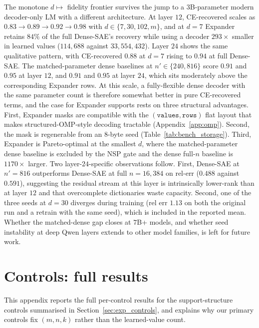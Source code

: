 \documentclass{article}
\theoremstyle{plain}
\theoremstyle{definition}
\theoremstyle{remark}
\begin{document}
The monotone $d \mapsto$ fidelity frontier survives the jump to a 3B-parameter modern decoder-only LM with a different architecture. At layer $12$, CE-recovered scales as $0.83 \to 0.89 \to 0.92 \to 0.98$ with $d \in \{7, 30, 102, m\}$, and at $d{=}7$ Expander retains $84\%$ of the full Dense-SAE's recovery while using a decoder $293\times$ smaller in learned values ($114{,}688$ against $33{,}554{,}432$). Layer $24$ shows the same qualitative pattern, with CE-recovered $0.88$ at $d{=}7$ rising to $0.94$ at full Dense-SAE. The matched-parameter dense baselines at $n' \in \{240, 816\}$ score $0.91$ and $0.95$ at layer $12$, and $0.91$ and $0.95$ at layer $24$, which sits moderately above the corresponding Expander rows. At this scale, a fully-flexible dense decoder with the same parameter count is therefore somewhat better in pure CE-recovered terms, and the case for Expander supports rests on three structural advantages. First, Expander masks are compatible with the $(\texttt{values}, \texttt{rows})$ flat layout that makes structured-OMP-style decoding tractable (Appendix~\ref{app:omp}). Second, the mask is regenerable from an $8$-byte seed (Table~\ref{tab:bench_storage}). Third, Expander is Pareto-optimal at the smallest $d$, where the matched-parameter dense baseline is excluded by the NSP gate and the dense full-$n$ baseline is $1170\times$ larger. Two layer-$24$-specific observations follow. First, Dense-SAE at $n'{=}816$ outperforms Dense-SAE at full $n{=}16{,}384$ on rel-err ($0.488$ against $0.591$), suggesting the residual stream at this layer is intrinsically lower-rank than at layer $12$ and that overcomplete dictionaries waste capacity. Second, one of the three seeds at $d{=}30$ diverges during training (rel err $1.13$ on both the original run and a retrain with the same seed), which is included in the reported mean. Whether the matched-dense gap closes at $7$B+ models, and whether seed instability at deep Qwen layers extends to other model families, is left for future work.






\section{Controls: full results}
\label{app:controls_full}

This appendix reports the full per-control results for the support-structure controls summarised in Section~\ref{sec:exp_controls}, and explains why our primary controls fix $(m,n,k)$ rather than the learned-value count.
\end{document}
